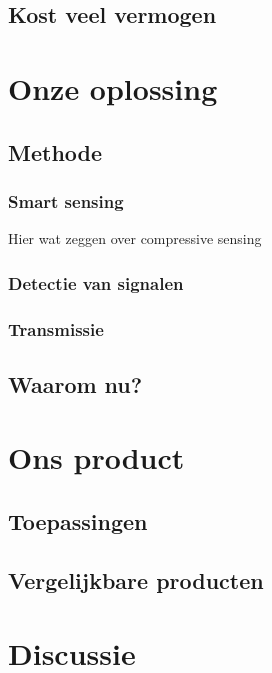 \documentclass[oneside, a4paper, openany]{article}
\begin{document}
\subsection{Kost veel vermogen}


\section{Onze oplossing}
\subsection{Methode}
\subsubsection{Smart sensing}
Hier wat zeggen over compressive sensing
\subsubsection{Detectie van signalen}
\subsubsection{Transmissie}

\subsection{Waarom nu?}


\section{Ons product}
\subsection{Toepassingen}
\subsection{Vergelijkbare producten}

\section{Discussie}
\end{document}
